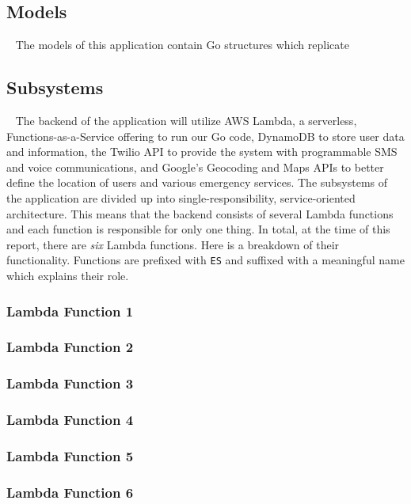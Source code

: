 \documentclass[10pt, a4paper]{article}
\begin{document}
\subsection{Models}
\par ~ The models of this application contain Go structures which replicate 

\subsection{Subsystems}
\par ~ The backend of the application will utilize AWS Lambda, a serverless, Functions-as-a-Service offering to run our Go code, DynamoDB to store user data and information, the Twilio API to provide the system with programmable SMS and voice communications, and Google's Geocoding and Maps APIs to better define the location of users and various emergency services. The subsystems of the application are divided up into single-responsibility, service-oriented architecture. This means that the backend consists of several Lambda functions and each function is responsible for only one thing. In total, at the time of this report, there are \emph{six} Lambda functions. Here is a breakdown of their functionality. Functions are prefixed with \texttt{ES} and suffixed with a meaningful name which explains their role.

\subsubsection{Lambda Function 1}
\subsubsection{Lambda Function 2}
\subsubsection{Lambda Function 3}
\subsubsection{Lambda Function 4}
\subsubsection{Lambda Function 5}
\subsubsection{Lambda Function 6}
\end{document}
